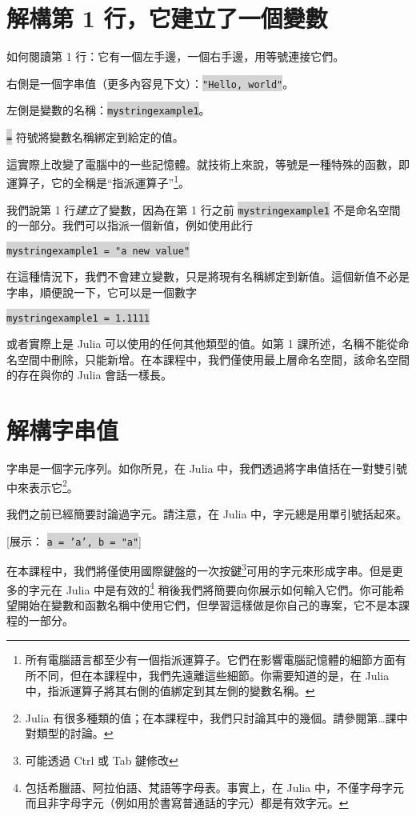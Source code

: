 \documentclass[]{article}
\begin{document}
\section*{解構第 1 行，它建立了一個變數}



如何閱讀第 1 行：它有一個左手邊，一個右手邊，用等號連接它們。

右側是一個字串值（更多內容見下文）：\colorbox{lightgray}{\tt "Hello, world"}。

左側是變數的名稱：\colorbox{lightgray}{\tt mystringexample1}。

\colorbox{lightgray}{\tt =} 符號將變數名稱綁定到給定的值。

這實際上改變了電腦中的一些記憶體。就技術上來說，等號是一種特殊的函數，即運算子，它的全稱是``指派運算子''\footnote{所有電腦語言都至少有一個指派運算子。它們在影響電腦記憶體的細節方面有所不同，但在本課程中，我們先遠離這些細節。你需要知道的是，在 Julia 中，指派運算子將其右側的值綁定到其左側的變數名稱。}。

我們說第 1 行\emph{建立}了變數，因為在第 1 行之前 \colorbox{lightgray}{\tt mystringexample1} 不是命名空間的一部分。我們可以指派一個新值，例如使用此行

\colorbox{lightgray}{\tt mystringexample1 = "a new value"}

在這種情況下，我們不會建立變數，只是將現有名稱綁定到新值。這個新值不必是字串，順便說一下，它可以是一個數字

\colorbox{lightgray}{\tt mystringexample1 = 1.1111}

或者實際上是 Julia 可以使用的任何其他類型的值。如第 1 課所述，名稱不能從命名空間中刪除，只能新增。在本課程中，我們僅使用最上層命名空間，該命名空間的存在與你的 Julia 會話一樣長。

\section*{解構字串值}

字串是一個字元序列。如你所見，在 Julia 中，我們透過將字串值括在一對雙引號中來表示它\footnote{Julia 有很多種類的值；在本課程中，我們只討論其中的幾個。請參閱第\ldots 課中對類型的討論。}。

我們之前已經簡要討論過字元。請注意，在 Julia 中，字元總是用單引號括起來。

[展示： \colorbox{lightgray}{\tt a = 'a', b = "a"}]

在本課程中，我們將僅使用國際鍵盤的一次按鍵\footnote{可能透過 Ctrl 或 Tab 鍵修改}可用的字元來形成字串。但是更多的字元在 Julia 中是有效的\footnote{包括希臘語、阿拉伯語、梵語等字母表。事實上，在 Julia 中，不僅字母字元而且非字母字元（例如用於書寫普通話的字元）都是有效字元。} 稍後我們將簡要向你展示如何輸入它們。你可能希望開始在變數和函數名稱中使用它們，但學習這樣做是你自己的專案，它不是本課程的一部分。
\end{document}
